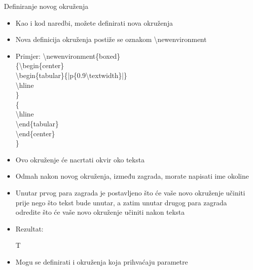 \documentclass{beamer}
\begin{document}
\begin{frame}{Definiranje novog okruženja}
\begin{itemize}

\item Kao i kod naredbi, možete definirati nova okruženja
\item Nova definicija okruženja postiže se oznakom \textbackslash newenvironment
\item Primjer:
\textbackslash newenvironment\{boxed\}\\
\{\textbackslash begin\{center\}\\
    \textbackslash begin\{tabular\}\{|p\{0.9\textbackslash textwidth\}|\}\\
    \textbackslash hline\\
    \}\\
    \{ \\
    \textbackslash hline\\
    \textbackslash end\{tabular\} \\
    \textbackslash end\{center\}\\
    \}\\
    \item Ovo okruženje će nacrtati okvir oko teksta
\end{itemize}
\end{frame}

\begin{frame}
\begin{itemize}
	\item Odmah nakon novog okruženja, između zagrada, morate napisati ime okoline
	\item Unutar prvog para zagrada je postavljeno što će vaše novo okruženje učiniti prije nego što tekst bude unutar, a zatim unutar drugog para zagrada odredite što će vaše novo okruženje učiniti nakon teksta
\item Rezultat:
\begin{boxed}
T
\end{boxed}

	\item Mogu se definirati i okruženja koja prihvaćaju parametre

\end{itemize}
\end{frame}
\end{document}
